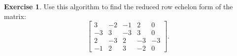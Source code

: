 \documentclass{beamer}
\theoremstyle{definition}
\newtheorem{exercise}{Exercise}
\begin{document}
\begin{frame}{\insertframenumber}
	\begin{exercise}
		Use this algorithm to find the reduced row echelon form of the matrix:
			$$\left[\begin{array}{rrrrr}
			3 & -2 & -1 & 2 & 0 \\
			-3 & 3 & -3 & 3 & 0 \\
			2 & -3 & 2 & -3 & -3 \\
			-1 & 2 & 3 & -2 & 0
			\end{array}\right].$$

\end{exercise}
\end{frame}
\end{document}
